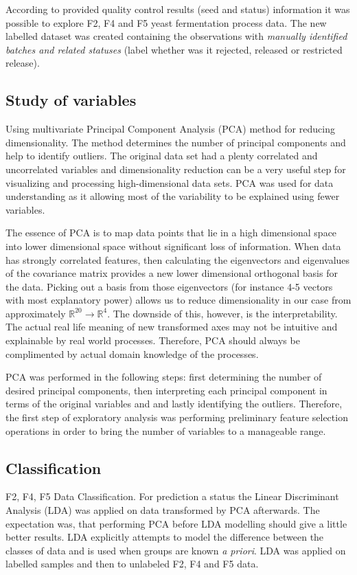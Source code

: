 \documentclass{article}
\begin{document}
According to provided quality control results (seed and status) information it was possible to explore F2, F4 and F5 yeast fermentation process data. The new labelled dataset was created containing the observations with \emph{manually identified batches and related statuses} (label whether was it rejected, released or restricted release).

\subsection{Study of variables}
Using multivariate Principal Component Analysis (PCA) method for reducing dimensionality. The method determines the number of principal components and help to identify outliers. The original data set had a plenty correlated and uncorrelated variables and dimensionality reduction can be a very useful step for visualizing and processing high-dimensional data sets.  PCA was used for data understanding as it allowing most of the variability to be explained using fewer variables.

The essence of PCA is to map data points that lie in a high dimensional space into lower dimensional space without significant loss of information. When data has strongly correlated features, then calculating the eigenvectors and eigenvalues of the covariance matrix provides a new lower dimensional orthogonal basis for the data. Picking out a basis from those eigenvectors (for instance 4-5 vectors with most explanatory power) allows us to reduce dimensionality in our case from approximately $\mathbb{R}^{20} \to \mathbb{R}^4$. The downside of this, however, is the interpretability. The actual real life meaning of new transformed axes may not be intuitive and explainable by real world processes. Therefore, PCA should always be complimented by actual domain knowledge of the processes.

PCA was performed in the following steps: first determining the number of desired principal components, then interpreting each principal component in terms of the original variables and and lastly identifying the outliers. Therefore, the first step of exploratory analysis was performing preliminary feature selection operations in order to bring the number of variables to a manageable range.
 
 \subsection{Classification}
F2, F4, F5 Data Classification.  For prediction a status the Linear Discriminant Analysis (LDA) was applied on data transformed by PCA afterwards. The expectation was, that performing PCA before LDA modelling should give a little better results. LDA explicitly attempts to model the difference between the classes of data and is used when groups are known \emph{a priori}.  LDA was applied on labelled samples and then to unlabeled F2, F4 and F5 data.
 
\end{document}
